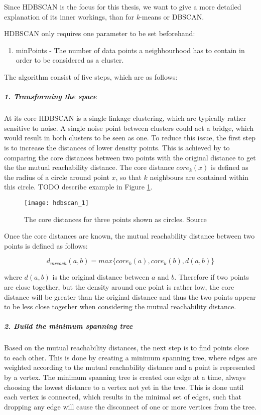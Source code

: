 Since HDBSCAN is the focus for this thesis, we want to give a more detailed explanation of its inner workings, than for \textit{k}-means or DBSCAN.

HDBSCAN only requires one parameter to be set beforehand:
\begin{enumerate}
    \item minPoints - The number of data points a neighbourhood has to contain in order to be considered as a cluster.
\end{enumerate}

The algorithm consist of five steps, which are as follows: 

\subparagraph{1. Transforming the space}

At its core HDBSCAN is a single linkage clustering, which are typically rather sensitive to noise. A single noise point between clusters could act a bridge, which would result in both clusters to be seen as one. To reduce this issue, the first step is to increase the distances of lower density points. This is achieved by to comparing the core distances between two points with the original distance to get the the mutual reachability distance. The core distance $core_k(x)$ is defined as the radius of a circle around point $x$, so that $k$ neighbours are contained within this circle. TODO describe example in Figure \ref{fig:hdbscan_1}. 

\begin{figure}[h]
    \centering
    \texttt{[image: hdbscan\_1]}
    \caption{The core distances for three points shown as circles. Source\cite{how_hdbscan_works}}
    \label{fig:hdbscan_1}
\end{figure}

Once the core distances are known, the mutual reachability distance between two points is defined as follows:

\begin{equation*}
    d_{mreach}(a, b) = max\{core_k(a), core_k(b), d(a, b)\}
\end{equation*}

where $d(a, b)$ is the original distance between $a$ and $b$. Therefore if two points are close together, but the density around one point is rather low, the core distance will be greater than the original distance and thus the two points appear to be less close together when considering the mutual reachability distance.

\subparagraph{2. Build the minimum spanning tree}

Based on the mutual reachability distances, the next step is to find points close  to each other. This is done by creating a minimum spanning tree, where edges are weighted according to the mutual reachability distance and a point is represented by a vertex. The minimum spanning tree is created one edge at a time, always choosing the lowest distance to a vertex not yet in the tree. This is done until each vertex is connected, which results in the minimal set of edges, such that dropping any edge will cause the disconnect of one or more vertices from the tree.

